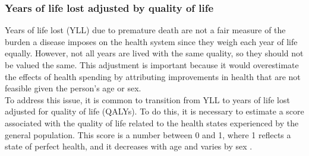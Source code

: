 \documentclass[11pt]{article}
\numberwithin{equation}{section}
\theoremstyle{remark}
\begin{document}
\begin{table}[H]
    \caption{\label{Tab: YLL} Total years of life lost due to excess deaths per disease, 2016-2019}
    \centering
    \hspace*{-0.8cm}
\end{table}

\subsubsection{Years of life lost adjusted by quality of life}

Years of life lost (YLL) due to premature death are not a fair measure of the burden a disease imposes on the health system since they weigh each year of life equally. However, not all years are lived with the same quality, so they should not be valued the same. This adjustment is important because it would overestimate the effects of health spending by attributing improvements in health that are not feasible given the person’s age or sex.\\

To address this issue, it is common to transition from YLL to years of life lost adjusted for quality of life (QALYs). To do this, it is necessary to estimate a score associated with the quality of life related to the health states experienced by the general population. This score is a number between 0 and 1, where 1 reflects a state of perfect health, and it decreases with age and varies by sex \parencite{Martin2021}.\\
\end{document}
